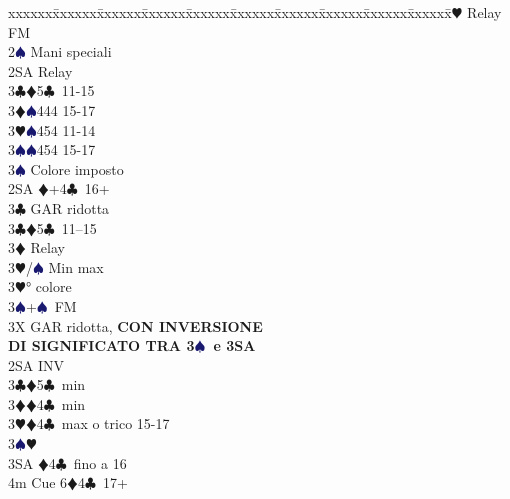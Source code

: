 \documentclass[a4paper,italian]{article}
\newcommand{\BC}{\textcolor{OliveGreen}{$\clubsuit$}}
\newcommand{\BD}{\textcolor{RedOrange}{$\vardiamondsuit$}}
\newcommand{\BH}{\textcolor{Red2}{$\varheartsuit${}}}
\newcommand{\BS}{\textcolor{MidnightBlue}{$\spadesuit${}}}
\newenvironment{bidtable}
{\begin{tabbing}

    xxxxxx\=xxxxxx\=xxxxxx\=xxxxxx\=xxxxxx\=xxxxxx\=xxxxxx\=xxxxxx\=xxxxxx\=xxxxxx\=\kill}
{\end{tabbing} }%
\begin{document}
\begin{multicols}{2}
\begin{bidtable}
                                            2\BH \> Relay FM\+\\
                                            2\BS \> Mani speciali\+\\
                                            2SA \> Relay\+\\
                                            3\BC {}\BD 5\BC\ 11-15\\
                                            3\BD {}\BS 444 15-17\\
                                            3\BH {}\BS 454 11-14\\
                                            3\BS {}\BS 454 15-17\-\\
                                            3\BS \> Colore imposto\-\\
                                            2SA \BD +4\BC\ 16+\+\\
                                            3\BC \> GAR ridotta\-\\
                                            3\BC {}\BD 5\BC\ 11--15\+\\
                                            3\BD \> Relay\+\\
                                            3\BH/\BS \> Min max\-\\
                                            3\BH {}° colore\\
                                            3\BS {}+\BS\ FM\-\\
                                            3X \> GAR ridotta, \textbf{CON INVERSIONE}\+\\
                                            \textbf{DI SIGNIFICATO TRA 3\BS\ e 3SA}\-\-\\
                                            2SA \> INV\+\\
                                            3\BC {}\BD 5\BC\ min\\
                                            3\BD {}\BD 4\BC\ min\\
                                            3\BH {}\BD 4\BC\ max o trico 15-17\+\\
                                            3\BS {}\BH \+\\
                                            3SA \BD 4\BC\ fino a 16\\
                                            4m \> Cue 6\BD 4\BC\ 17+\\

\end{bidtable}
\end{multicols}
\end{document}

